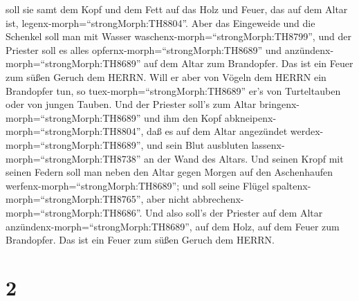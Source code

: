 soll sie samt dem Kopf und dem Fett auf das Holz und Feuer, das auf dem
Altar ist, legenx-morph=``strongMorph:TH8804''.  Aber das
Eingeweide und die Schenkel soll man mit Wasser
waschenx-morph=``strongMorph:TH8799'', und der Priester soll es alles
opfernx-morph=``strongMorph:TH8689'' und
anzündenx-morph=``strongMorph:TH8689'' auf dem Altar zum Brandopfer. Das
ist ein Feuer zum süßen Geruch dem HERRN.  Will er aber von
Vögeln dem HERRN ein Brandopfer tun, so
tuex-morph=``strongMorph:TH8689'' er's von Turteltauben oder von jungen
Tauben.  Und der Priester soll's zum Altar
bringenx-morph=``strongMorph:TH8689'' und ihm den Kopf
abkneipenx-morph=``strongMorph:TH8804'', daß es auf dem Altar angezündet
werdex-morph=``strongMorph:TH8689'', und sein Blut ausbluten
lassenx-morph=``strongMorph:TH8738'' an der Wand des Altars.
 Und seinen Kropf mit seinen Federn soll man neben den
Altar gegen Morgen auf den Aschenhaufen
werfenx-morph=``strongMorph:TH8689'';  und soll seine
Flügel spaltenx-morph=``strongMorph:TH8765'', aber nicht
abbrechenx-morph=``strongMorph:TH8686''. Und also soll's der Priester
auf dem Altar anzündenx-morph=``strongMorph:TH8689'', auf dem Holz, auf
dem Feuer zum Brandopfer. Das ist ein Feuer zum süßen Geruch dem HERRN.

\hypertarget{section-1}{%
\section{2}\label{section-1}}


